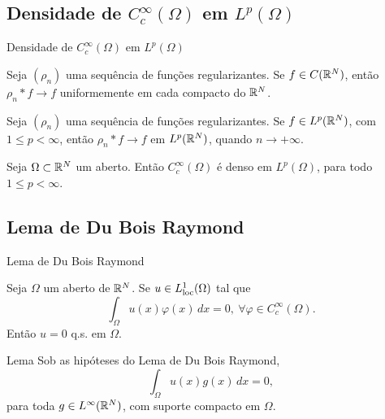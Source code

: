 \subsection*{Densidade de \texorpdfstring{$C_c^\infty(\Omega)$ em $L^p(\Omega)$}{C𞁞∞ (Ω) em L𞀾(Ω)}}
\begin{frame}{Densidade de $C_c^\infty(\Omega)$ em $L^p(\Omega)$}
	\begin{prop}
		Seja $(\rho_n)$ uma sequência de funções regularizantes. Se $f\in C(\mathbb{R}^N)$, então $\rho_n\ast f\to f$ uniformemente em cada compacto do $\mathbb{R}^N$.
		
	\end{prop}

\begin{prop}
	Seja $(\rho_n)$ uma sequência de funções regularizantes. Se $f\in L^p(\mathbb{R}^N)$, com $1\leq p<\infty$, então $\rho_n\ast f \to f$ em $L^p(\mathbb{R}^N)$, quando $n\to +\infty$.
\end{prop}

\begin{prop}\label{densLp}
	Seja $\Omega \subset \mathbb{R}^N$ um aberto. Então $C_c^\infty(\Omega)$ é denso em $L^p(\Omega)$, para todo $1\leq p<\infty$.
\end{prop}

\end{frame}

\subsection*{Lema de Du Bois Raymond}
\begin{frame}{Lema de Du Bois Raymond}
\begin{prop}
	Seja $\Omega$ um aberto de $\mathbb{R}^N$. Se $u\in L_{\operatorname{loc}}^1(\Omega)$ tal que 
	\[\int_\Omega u(x)\varphi(x)\, dx=0, \ \forall \varphi\in C_c^\infty(\Omega).\]
	Então $u=0$ q.s. em $\Omega$.  
\end{prop}

\begin{exampleblock}{Lema}
Sob as hipóteses do Lema de Du Bois Raymond,
\[
\int_\Omega u(x)g(x)\,dx=0,
\]
para toda \(g\in L^\infty(\mathbb{R}^N)\), com suporte compacto em \(\Omega\).
\end{exampleblock}

\end{frame}

